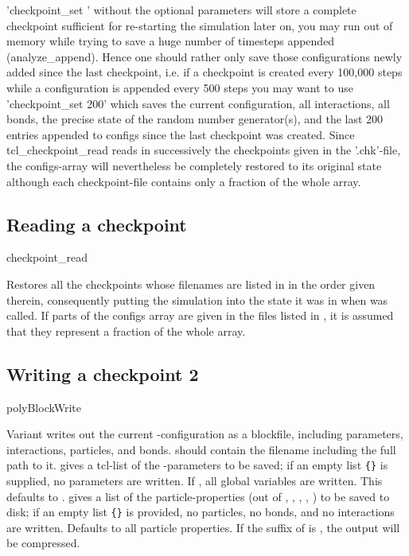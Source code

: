 'checkpoint\_set ' without the optional parameters
will store a complete checkpoint sufficient for re-starting the
simulation later on, you may run out of memory while trying to save a
huge number of timesteps appended (analyze\_append). Hence one should
rather only save those configurations newly added since the last
checkpoint, i.e. if a checkpoint is created every 100,000 steps while
a configuration is appended every 500 steps you may want to use
'checkpoint\_set  200' which saves the current
configuration, all interactions, all bonds, the precise state of the
random number generator(s), and the last 200 entries appended to
configs since the last checkpoint was created. Since
tcl\_checkpoint\_read reads in successively the checkpoints given in
the '.chk'-file, the configs-array will nevertheless be completely
restored to its original state although each checkpoint-file contains
only a fraction of the whole array.

\subsection{Reading a checkpoint}
\begin{essyntax}
  checkpoint_read 
\end{essyntax}
Restores all the checkpoints whose filenames are listed in
 in the order given therein, consequently putting the
simulation into the state it was in when  was
called. If parts of the configs array are given in the files listed in
, it is assumed that they represent a fraction of the
whole array.

\subsection{Writing a checkpoint 2}
\begin{essyntax}
   polyBlockWrite  
   
\end{essyntax}

Variant  writes out the current \es-configuration as a
blockfile, including parameters, interactions, particles, and bonds.
 should contain the filename including the full path to it.
 gives a tcl-list of the \es-parameters to be saved;
if an empty list \verb!{}! is supplied, no parameters are written.  If
, all global variables are written. This defaults to
.  gives a list of the particle-properties
(out of , , , , ) to be saved
to disk; if an empty list \verb!{}! is provided, no particles, no
bonds, and no interactions are written.  Defaults to all particle
properties.  If the suffix of  is , the output will
be compressed.

